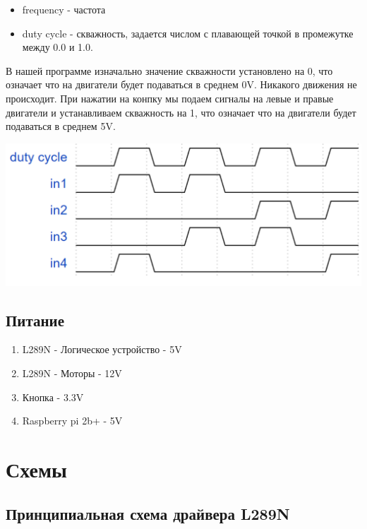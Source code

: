 \documentclass[a4paper,12pt]{article}
\begin{document}
\begin{itemize}
  \item frequency - частота
  \item duty cycle - скважность, задается числом с плавающей точкой в промежутке между 0.0 и 1.0.
\end{itemize}
В нашей программе изначально значение скважности установлено на 0, что означает что на двигатели будет подаваться в среднем 0\unit{\volt}. Никакого
движения не происходит. При нажатии на конпку мы подаем сигналы на левые и правые двигатели и устанавливаем скважность на 1, что означает что на двигатели
будет подаваться в среднем 5\unit{\volt}.

\begin{center}
  \includegraphics[width=\textwidth]{waveform.pdf}
\end{center}

\subsection{Питание}
\begin{enumerate}
  \item L289N - Логическое устройство - 5\unit{\volt}
  \item L289N - Моторы - 12\unit{\volt}
  \item Кнопка - 3.3\unit{\volt}
  \item Raspberry pi 2b+ - 5\unit{\volt}
\end{enumerate}

\section{Схемы}
\subsection{Принципиальная схема драйвера L289N}
\end{document}
